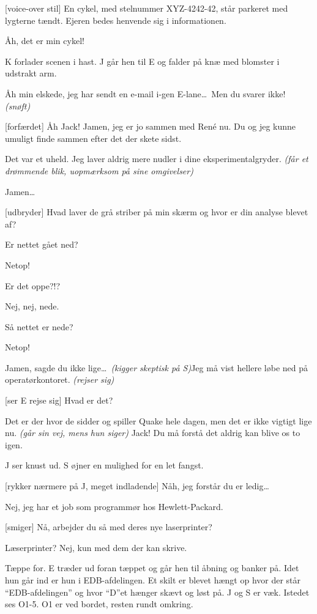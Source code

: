 \documentclass[danish]{article}
\begin{document}
\begin{sketch}
[voice-over stil] En cykel, med stelnummer XYZ-4242-42, står parkeret
med lygterne tændt. Ejeren bedes henvende sig i informationen.

 Åh, det er min cykel!

\scene K forlader scenen i hast. J går hen til E og falder på knæ med blomster i
udstrakt arm.

 Åh min elskede, jeg har sendt en e-mail i-gen E-lane\ldots\ Men du
svarer ikke! \emph{(snøft)}

[forfærdet] Åh Jack! Jamen, jeg er jo sammen med Ren\'e nu. Du og jeg
kunne umuligt finde sammen efter det der skete sidst.

 Det var et uheld. Jeg laver aldrig mere nudler i dine
eksperimentalgryder. \emph{(får et drømmende blik, uopmærksom på sine
  omgivelser)}

 Jamen\ldots

[udbryder] Hvad laver de grå striber på min skærm og hvor er din analyse
blevet af?

 Er nettet gået ned?

 Netop!

 Er det oppe?!?

 Nej, nej, nede.

 Så nettet er nede?

 Netop!

 Jamen, sagde du ikke lige\ldots\ \emph{(kigger skeptisk på S)}Jeg må
vist hellere løbe ned på operatørkontoret. \emph{(rejser sig)}

[ser E rejse sig] Hvad er det?

 Det er der hvor de sidder og spiller Quake hele dagen, men det er ikke
vigtigt lige nu. \emph{(går sin vej, mens hun siger)} Jack! Du må forstå det
aldrig kan blive os to igen.

\scene J ser knust ud. S øjner en mulighed for en let fangst.

[rykker nærmere på J, meget indladende] Nåh, jeg forstår du er
ledig\ldots

 Nej, jeg har et job som programmør hos Hewlett-Packard.

[smiger] Nå, arbejder du så med deres nye laserprinter?

 Læserprinter? Nej, kun med dem der kan skrive.

\scene Tæppe for. E træder ud foran tæppet og går hen til åbning og banker på.
Idet hun går ind er hun i EDB-afdelingen. Et skilt er blevet hængt op hvor der
står ``EDB-afdelingen'' og hvor ``D''et hænger skævt og løst på. J og S er væk.
Istedet ses O1-5. O1 er ved bordet, resten rundt omkring.


\end{sketch}
\end{document}
